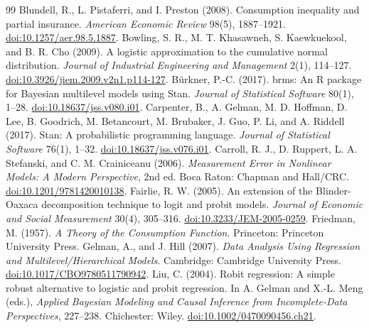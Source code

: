 \documentclass[11pt]{article}
\begin{document}
\begingroup\raggedright
\begin{thebibliography}{99}
 Blundell, R., L. Pistaferri, and I. Preston (2008). Consumption inequality and partial insurance. \emph{American Economic Review} 98(5), 1887--1921. \href{https://doi.org/10.1257/aer.98.5.1887}{doi:10.1257/aer.98.5.1887}.
 Bowling, S. R., M. T. Khasawneh, S. Kaewkuekool, and B. R. Cho (2009). A logistic approximation to the cumulative normal distribution. \emph{Journal of Industrial Engineering and Management} 2(1), 114--127. \href{https://doi.org/10.3926/jiem.2009.v2n1.p114-127}{doi:10.3926/jiem.2009.v2n1.p114-127}.
 B{\"u}rkner, P.-C. (2017). brms: An R package for Bayesian multilevel models using Stan. \emph{Journal of Statistical Software} 80(1), 1--28. \href{https://doi.org/10.18637/jss.v080.i01}{doi:10.18637/jss.v080.i01}.
 Carpenter, B., A. Gelman, M. D. Hoffman, D. Lee, B. Goodrich, M. Betancourt, M. Brubaker, J. Guo, P. Li, and A. Riddell (2017). Stan: A probabilistic programming language. \emph{Journal of Statistical Software} 76(1), 1--32. \href{https://doi.org/10.18637/jss.v076.i01}{doi:10.18637/jss.v076.i01}.
 Carroll, R. J., D. Ruppert, L. A. Stefanski, and C. M. Crainiceanu (2006). \emph{Measurement Error in Nonlinear Models: A Modern Perspective}, 2nd ed. Boca Raton: Chapman and Hall/CRC. \href{https://doi.org/10.1201/9781420010138}{doi:10.1201/9781420010138}.
 Fairlie, R. W. (2005). An extension of the Blinder-Oaxaca decomposition technique to logit and probit models. \emph{Journal of Economic and Social Measurement} 30(4), 305--316. \href{https://doi.org/10.3233/JEM-2005-0259}{doi:10.3233/JEM-2005-0259}.
 Friedman, M. (1957). \emph{A Theory of the Consumption Function}. Princeton: Princeton University Press.
 Gelman, A., and J. Hill (2007). \emph{Data Analysis Using Regression and Multilevel/Hierarchical Models}. Cambridge: Cambridge University Press. \href{https://doi.org/10.1017/CBO9780511790942}{doi:10.1017/CBO9780511790942}.
 Liu, C. (2004). Robit regression: A simple robust alternative to logistic and probit regression. In A. Gelman and X.-L. Meng (eds.), \emph{Applied Bayesian Modeling and Causal Inference from Incomplete-Data Perspectives}, 227--238. Chichester: Wiley. \href{https://doi.org/10.1002/0470090456.ch21}{doi:10.1002/0470090456.ch21}.

\end{thebibliography}
\end{document}
